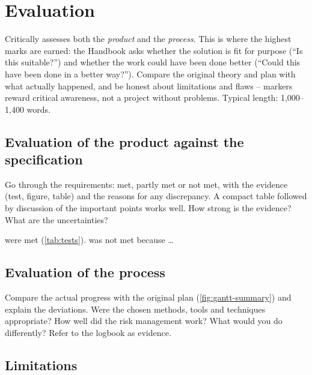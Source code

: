\chapter{Evaluation}
\label{ch:evaluation}

\begin{guidance}
Critically assesses both the \emph{product} and the \emph{process}. This is
where the highest marks are earned: the Handbook asks whether the solution is
fit for purpose (\enquote{Is this suitable?}) and whether the work could have
been done better (\enquote{Could this have been done in a better way?}).
Compare the original theory and plan with what actually happened, and be
honest about limitations and flaws -- markers reward critical awareness, not
a project without problems. Typical length: 1,000--1,400 words.
\end{guidance}

\section{Evaluation of the product against the specification}
\label{sec:eval-product}

\begin{guidance}
Go through the requirements: met, partly met or not met, with the evidence
(test, figure, table) and the reasons for any discrepancy. A compact table
followed by discussion of the important points works well. How strong is the
evidence? What are the uncertainties?
\end{guidance}

 were met (\cref{tab:tests}).
 was not met because \ldots

\section{Evaluation of the process}
\label{sec:eval-process}

\begin{guidance}
Compare the actual progress with the original plan (\cref{fig:gantt-summary})
and explain the deviations. Were the chosen methods, tools and techniques
appropriate? How well did the risk management work? What would you do
differently? Refer to the logbook as evidence.
\end{guidance}

\section{Limitations}
\label{sec:limitations}
